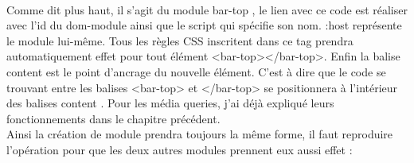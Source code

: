 \documentclass{article}
\begin{document}
\vspace{0.5cm}\\
Comme dit plus haut, il s'agit du module \og bar-top \fg{}, le lien avec ce code est r\'ealiser avec l'id du dom-module ainsi que le script qui sp\'ecifie son nom. \og :host \fg{} repr\'esente le module lui-m\^eme. Tous les r\`egles CSS inscritent dans ce tag prendra automatiquement effet pour tout \'el\'ement <bar-top></bar-top>. Enfin la balise \og content \fg{} est le point d'ancrage du nouvelle \'el\'ement. C'est \`a dire que le code se trouvant entre les balises <bar-top> et </bar-top> se positionnera \`a l'int\'erieur des balises \og content \fg{}. Pour les m\'edia queries, j'ai d\'ej\`a expliqu\'e leurs fonctionnements dans le chapitre pr\'ec\'edent.\\
Ainsi la cr\'eation de module prendra toujours la m\^eme forme, il faut reproduire l'op\'eration pour que les deux autres modules prennent eux aussi effet :   
\vspace{0.5cm}\\
\end{document}
